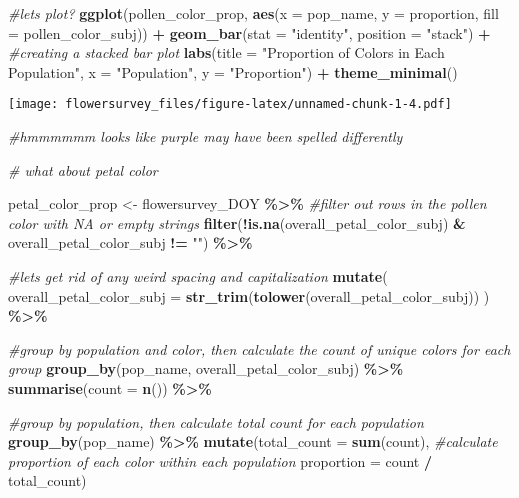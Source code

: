 \documentclass[
]{article}
\newenvironment{Shaded}{\begin{snugshade}}{\end{snugshade}}
\newcommand{\AttributeTok}[1]{\textcolor[rgb]{0.13,0.29,0.53}{#1}}
\newcommand{\CommentTok}[1]{\textcolor[rgb]{0.56,0.35,0.01}{\textit{#1}}}
\newcommand{\FunctionTok}[1]{\textcolor[rgb]{0.13,0.29,0.53}{\textbf{#1}}}
\newcommand{\NormalTok}[1]{#1}
\newcommand{\OtherTok}[1]{\textcolor[rgb]{0.56,0.35,0.01}{#1}}
\newcommand{\SpecialCharTok}[1]{\textcolor[rgb]{0.81,0.36,0.00}{\textbf{#1}}}
\newcommand{\StringTok}[1]{\textcolor[rgb]{0.31,0.60,0.02}{#1}}
\begin{document}
\begin{Shaded}
\begin{Highlighting}[]
\CommentTok{\#let\textquotesingle{}s plot?}
\FunctionTok{ggplot}\NormalTok{(pollen\_color\_prop, }\FunctionTok{aes}\NormalTok{(}\AttributeTok{x =}\NormalTok{ pop\_name, }\AttributeTok{y =}\NormalTok{ proportion, }\AttributeTok{fill =}\NormalTok{ pollen\_color\_subj)) }\SpecialCharTok{+}
  \FunctionTok{geom\_bar}\NormalTok{(}\AttributeTok{stat =} \StringTok{"identity"}\NormalTok{, }\AttributeTok{position =} \StringTok{"stack"}\NormalTok{) }\SpecialCharTok{+} \CommentTok{\#creating a stacked bar plot}
  \FunctionTok{labs}\NormalTok{(}\AttributeTok{title =} \StringTok{"Proportion of Colors in Each Population"}\NormalTok{,}
       \AttributeTok{x =} \StringTok{"Population"}\NormalTok{,}
       \AttributeTok{y =} \StringTok{"Proportion"}\NormalTok{) }\SpecialCharTok{+}
  \FunctionTok{theme\_minimal}\NormalTok{()}
\end{Highlighting}
\end{Shaded}

\texttt{[image: flowersurvey\_files/figure-latex/unnamed-chunk-1-4.pdf]}

\begin{Shaded}
\begin{Highlighting}[]
\CommentTok{\#hmmmmmm looks like purple may have been spelled differently}

\CommentTok{\# what about petal color}

\NormalTok{petal\_color\_prop }\OtherTok{\textless{}{-}}\NormalTok{ flowersurvey\_DOY }\SpecialCharTok{\%\textgreater{}\%}
  \CommentTok{\#filter out rows in the pollen color with NA or empty strings}
  \FunctionTok{filter}\NormalTok{(}\SpecialCharTok{!}\FunctionTok{is.na}\NormalTok{(overall\_petal\_color\_subj) }\SpecialCharTok{\&}\NormalTok{ overall\_petal\_color\_subj }\SpecialCharTok{!=} \StringTok{""}\NormalTok{) }\SpecialCharTok{\%\textgreater{}\%}
  
  \CommentTok{\#let\textquotesingle{}s get rid of any weird spacing and capitalization}
  \FunctionTok{mutate}\NormalTok{(}
    \AttributeTok{overall\_petal\_color\_subj =} \FunctionTok{str\_trim}\NormalTok{(}\FunctionTok{tolower}\NormalTok{(overall\_petal\_color\_subj))}
\NormalTok{  ) }\SpecialCharTok{\%\textgreater{}\%}
  
  \CommentTok{\#group by population and color, then calculate the count of unique colors for each group}
  \FunctionTok{group\_by}\NormalTok{(pop\_name, overall\_petal\_color\_subj) }\SpecialCharTok{\%\textgreater{}\%}
  \FunctionTok{summarise}\NormalTok{(}\AttributeTok{count =} \FunctionTok{n}\NormalTok{()) }\SpecialCharTok{\%\textgreater{}\%}
  
  \CommentTok{\#group by population, then calculate total count for each population}
  \FunctionTok{group\_by}\NormalTok{(pop\_name) }\SpecialCharTok{\%\textgreater{}\%}
  \FunctionTok{mutate}\NormalTok{(}\AttributeTok{total\_count =} \FunctionTok{sum}\NormalTok{(count),}
         \CommentTok{\#calculate proportion of each color within each population}
         \AttributeTok{proportion =}\NormalTok{ count }\SpecialCharTok{/}\NormalTok{ total\_count)}
\end{Highlighting}
\end{Shaded}
\end{document}
